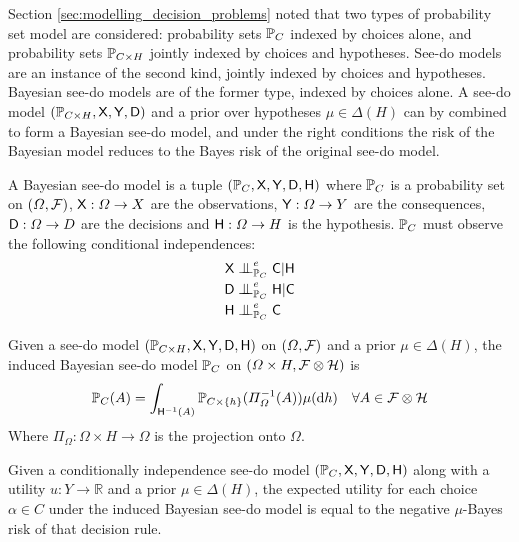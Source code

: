Section \ref{sec:modelling_decision_problems} noted that two types of probability set model are considered: probability sets $\mathbb{P}_C$ indexed by choices alone, and probability sets $\mathbb{P}_{C\times H}$ jointly indexed by choices and hypotheses. See-do models are an instance of the second kind, jointly indexed by choices and hypotheses. Bayesian see-do models are of the former type, indexed by choices alone. A see-do model $(\mathbb{P}_{C\times H}, \mathsf{X},\mathsf{Y},\mathsf{D})$ and a prior over hypotheses $\mu\in \Delta(H)$ can by combined to form a Bayesian see-do model, and under the right conditions the risk of the Bayesian model reduces to the Bayes risk of the original see-do model.

\begin{definition}
A Bayesian see-do model is a tuple $(\mathbb{P}_{C}, \mathsf{X},\mathsf{Y},\mathsf{D},\mathsf{H})$ where $\mathbb{P}_C$ is a probability set on $(\Omega,\mathcal{F})$, $\mathsf{X}:\Omega\to X$ are the observations, $\mathsf{Y}:\Omega\to Y$ are the consequences, $\mathsf{D}:\Omega\to D$ are the decisions and $\mathsf{H}:\Omega\to H$ is the hypothesis. $\mathbb{P}_C$ must observe the following conditional independences:
\begin{align}
    \RV{X}&\CI^e_{\prob{P}_{C}} \RV{C}|\RV{H}\\
    \RV{D}&\CI^e_{\prob{P}_{C}} \RV{H}|\RV{C}\\
    \RV{H}&\CI^e_{\prob{P}_C} \RV{C}
\end{align}
\end{definition}

\begin{definition}
Given a see-do model $(\mathbb{P}_{C\times H}, \mathsf{X},\mathsf{Y},\mathsf{D},\mathsf{H})$ on $(\Omega,\mathcal{F})$ and a prior $\mu\in \Delta(H)$, the induced Bayesian see-do model $\mathbb{P}_C$ on $(\Omega\times H,\mathcal{F}\otimes \mathcal{H})$ is
\begin{align}
    \mathbb{P}_C(A) &= \int_{\mathsf{H}^{-1}(A)} \mathbb{P}_{C\times \{h\}}(\Pi_{\Omega}^{-1}(A))\mu(\mathrm{d}h)&\forall A\in \mathcal{F}\otimes\mathcal{H}
\end{align}
Where $\Pi_\Omega:\Omega\times H\to \Omega$ is the projection onto $\Omega$.
\end{definition}

\begin{theorem}
Given a conditionally independence see-do model $(\mathbb{P}_{C}, \mathsf{X},\mathsf{Y},\mathsf{D},\mathsf{H})$ along with a utility $u:Y\to \mathbb{R}$ and a prior $\mu\in \Delta(H)$, the expected utility for each choice $\alpha\in C$ under the induced Bayesian see-do model is equal to the negative $\mu$-Bayes risk of that decision rule.
\end{theorem}


